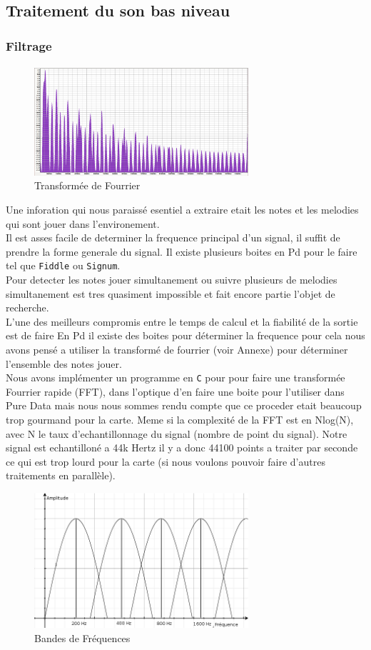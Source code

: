 \documentclass[a4paper, titlepage, oneside, 12pt]{article}%
\begin{document}
\subsection{Traitement du son bas niveau}
\subsubsection{Filtrage}
\paragraph{}
\begin{figure}[H]
	\centering
	\includegraphics[width=300px]{fft.jpg}
	\caption{Transformée de Fourrier}
\end{figure}
Une inforation qui nous paraissé esentiel a extraire etait les notes et les melodies qui sont jouer dans l'environement.\\
Il est asses facile de determiner la frequence principal d'un signal, il suffit de prendre la forme generale du signal. Il existe plusieurs boites en Pd pour le faire tel que \texttt{Fiddle} ou \texttt{Signum}.\\
Pour detecter les notes jouer simultanement ou suivre plusieurs de melodies simultanement est tres quasiment impossible et fait encore partie l'objet de recherche.\\
L'une des meilleurs compromis entre le temps de calcul et la fiabilité de la sortie est de faire 
En Pd il existe des boites pour déterminer la frequence pour cela nous avons pensé a utiliser la transformé de fourrier (voir Annexe) pour déterminer l'ensemble des notes jouer. \\
Nous avons implémenter un programme en \texttt{C} pour pour faire une transformée Fourrier rapide (FFT), dans l'optique d'en faire une boite pour l'utiliser dans Pure Data mais nous nous sommes rendu compte que ce proceder etait beaucoup trop gourmand pour la carte. Meme si la complexité de la FFT est en Nlog(N), avec N le taux d'echantillonnage du signal (nombre de point du signal). Notre signal est echantilloné a 44k Hertz il y a donc 44100 points a traiter par seconde ce qui est trop lourd pour la carte (si nous voulons pouvoir faire d'autres traitements en parallèle).
\begin{figure}[H]
	\centering
	\includegraphics[width=300px]{filtre.jpg}
	\caption{Bandes de Fréquences}
\end{figure}
\end{document}
